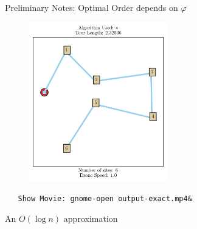 \documentclass{beamer}
\begin{document}

\begin{frame}[fragile]{Preliminary Notes: Optimal Order depends on $\varphi$}
  \vspace{-10pt}
  \begin{figure}
    \centering
    \includegraphics[width=6cm]{slide_imgs/frame-exact-00000.png}
  \end{figure}

\vspace{-15pt} 
{\color{coolgrey} {\tiny 
  \begin{verbatim}
   Show Movie: gnome-open output-exact.mp4&
  \end{verbatim} } }
  
\end{frame}


\begin{frame}{An $O(\log n)$ approximation}
\end{frame}
\end{document}
